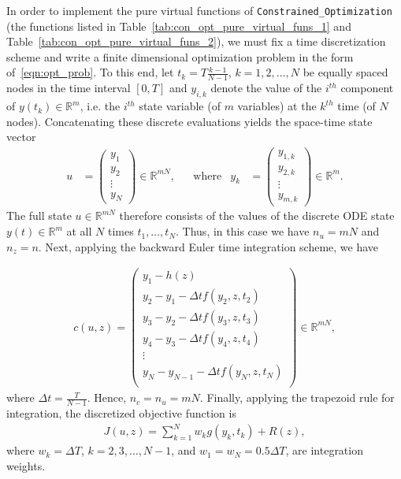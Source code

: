\documentclass{article}
\def\R{{\mathbb R}}
\begin{document}
In order to implement the pure virtual functions of \texttt{Constrained\_Optimization} (the functions listed in Table~\ref{tab:con_opt_pure_virtual_funs_1} and Table~\ref{tab:con_opt_pure_virtual_funs_2}), we must fix a time discretization scheme and write a finite dimensional optimization problem in the form of~\eqref{eqn:opt_prob}. To this end, let $t_k=T\frac{k-1}{N-1}$, $k=1,2,\dots,N$ be equally spaced nodes in the time interval $[0,T]$ and $y_{i,k}$ denote the value of the $i^{th}$ component of $y(t_k)\in\R^{m}$, i.e. the $i^{th}$ state variable (of $m$ variables) at the $k^{th}$ time (of $N$ nodes). Concatenating these discrete evaluations yields the space-time state vector
\begin{align*}
    u
    &= \left(\begin{array}{c}
        y_1 \\ y_2 \\ \vdots \\ y_N
    \end{array}\right)
    \in \R^{mN},
    &&\text{where}&
    y_k
    &= \left(\begin{array}{c}
        y_{1,k} \\ y_{2,k} \\ \vdots \\ y_{m,k}
    \end{array}\right) \in \R^{m}.
\end{align*}
The full state $u\in\R^{mN}$ therefore consists of the values of the discrete ODE state $y(t)\in\R^{m}$ at all $N$ times $t_{1},\ldots,t_{N}$.
Thus, in this case we have $n_{u} = mN$ and $n_{z} = n$.
Next, applying the backward Euler time integration scheme, we have

\begin{align}
\label{eqn:back_euler}
    c(u,z) =
    \left(\begin{array}{c}
        y_1-h(z) \\
        y_2 - y_1 - \Delta t f(y_2,z,t_2) \\
        y_3 - y_2 - \Delta t f(y_3,z,t_3) \\
        y_4 - y_3 - \Delta t f(y_4,z,t_4) \\
        \vdots \\
        y_N - y_{N-1} - \Delta t f(y_N,z,t_N) \\
    \end{array}\right) \in \R^{mN},
\end{align}
where $\Delta t = \frac{T}{N-1}$. Hence, $n_{c} = n_{u} = mN$. Finally, applying the trapezoid rule for integration, the discretized objective function is
\begin{align}
    \label{eqn:dis_trap_objective}
    J(u,z) = \sum\limits_{k=1}^N w_k g(y_k,t_k) + R(z),
\end{align}
where $w_k=\Delta T$, $k=2,3,\dots,N-1$, and $w_1=w_N=0.5 \Delta T$, are integration weights.
\end{document}
